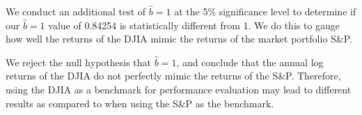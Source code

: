 \documentclass[a4paper]{article}
\begin{document}
	We conduct an additional test of $\hat{b}=1$ at the 5\% significance level to determine if our $\hat{b}=1$ value of 0.84254 is statistically different from 1. We do this to gauge how well the returns of the DJIA mimic the returns of the market portfolio S\&P. 
	
	We reject the null hypothesis that $\hat{b}=1$, and conclude that the annual log returns of the DJIA do not perfectly mimic the returns of the S\&P. Therefore, using the DJIA as a benchmark for performance evaluation may lead to different results as compared to when using the S\&P as the benchmark. 
	
\end{document}
